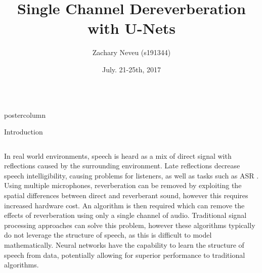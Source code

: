 ﻿\documentclass[final,hyperref={pdfpagelabels=false}]{beamer}
\title{\huge Single Channel Dereverberation with U-Nets}
\author{Zachary Neveu (s191344)}
\institute[Department]{\small DTU Compute}
\date[July. 21-25th, 2017]{July. 21-25th, 2017}
\newlength{\columnheight}
\begin{document}
\begin{frame}
 \begin{columns}
 \begin{column}{.49\paperwidth}
 \begin{beamercolorbox}[center,wd=\textwidth]{postercolumn}
 \begin{minipage}[T]{.99\textwidth}  %
 \parbox[t][\columnheight]{\textwidth}{ %

\begin{block}{Introduction}
 \begin{columns}
 \begin{column}{1\textwidth}

\centering
\begin{minipage}[t]{0.98\textwidth}

\small{In real world environments, speech is heard as a mix of direct signal with reflections caused by the surrounding environment. Late reflections decrease speech intelligibility, causing problems for listeners, as well as tasks such as \ac{ASR} . Using multiple microphones, reverberation can be removed by exploiting the spatial differences between direct and reverberant sound, however this requires increased hardware cost. An algorithm is then required which can remove the effects of reverberation using only a single channel of audio. Traditional signal processing approaches can solve this problem, however these algorithms typically do not leverage the structure of speech, as this is difficult to model mathematically. Neural networks have the capability to learn the structure of speech from data, potentially allowing for superior performance to traditional algorithms.
}

\end{minipage} \hspace{1cm}


      
\end{column}
 \end{columns}
 \end{block}
 \vfill


}
\end{minipage}
\end{beamercolorbox}
\end{column}
\end{columns}
\end{frame}
\end{document}
